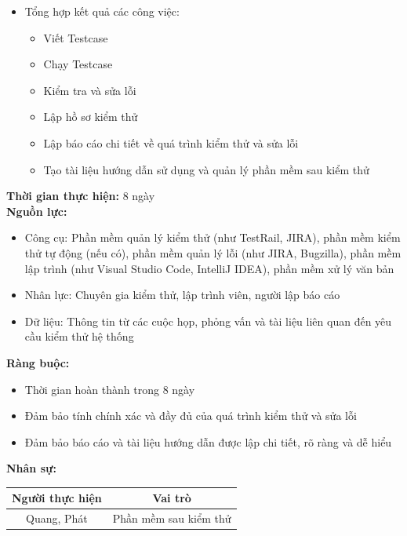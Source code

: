 {\begin{minipage}{\textwidth}
\begin{itemize}
        \item Tổng hợp kết quả các công việc:
        \begin{itemize}
            \item Viết Testcase
            \item Chạy Testcase
            \item Kiểm tra và sửa lỗi
            \item Lập hồ sơ kiểm thử
            \item Lập báo cáo chi tiết về quá trình kiểm thử và sửa lỗi
            \item Tạo tài liệu hướng dẫn sử dụng và quản lý phần mềm sau kiểm thử
        \end{itemize}
    \end{itemize}
    \vspace{0.5cm}
    \noindent \textbf{Thời gian thực hiện:} 8 ngày \\
    \noindent \textbf{Nguồn lực:}
    \begin{itemize}
        \item Công cụ: Phần mềm quản lý kiểm thử (như TestRail, JIRA), phần mềm kiểm thử tự động (nếu có), phần mềm quản lý lỗi (như JIRA, Bugzilla), phần mềm lập trình (như Visual Studio Code, IntelliJ IDEA), phần mềm xử lý văn bản
        \item Nhân lực: Chuyên gia kiểm thử, lập trình viên, người lập báo cáo
        \item Dữ liệu: Thông tin từ các cuộc họp, phỏng vấn và tài liệu liên quan đến yêu cầu kiểm thử hệ thống
    \end{itemize}
    \vspace{0.5cm}
    \noindent \textbf{Ràng buộc:}
    \begin{itemize}
        \item Thời gian hoàn thành trong 8 ngày
        \item Đảm bảo tính chính xác và đầy đủ của quá trình kiểm thử và sửa lỗi
        \item Đảm bảo báo cáo và tài liệu hướng dẫn được lập chi tiết, rõ ràng và dễ hiểu
    \end{itemize}
    \vspace{0.5cm}
    \noindent \textbf{Nhân sự:}
    \begin{longtable}{|c|c|}
    \hline
    \textbf{Người thực hiện} & \textbf{Vai trò} \\
    \hline
    Quang, Phát & Phần mềm sau kiểm thử \\
    \hline
    \end{longtable}

\end{minipage}}
